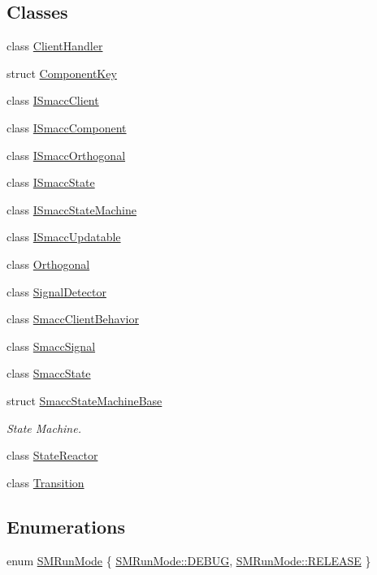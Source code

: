 \subsection*{Classes}
\begin{DoxyCompactItemize}
\item 
class \hyperlink{classsmacc_1_1ClientHandler}{Client\+Handler}
\item 
struct \hyperlink{structsmacc_1_1ComponentKey}{Component\+Key}
\item 
class \hyperlink{classsmacc_1_1ISmaccClient}{I\+Smacc\+Client}
\item 
class \hyperlink{classsmacc_1_1ISmaccComponent}{I\+Smacc\+Component}
\item 
class \hyperlink{classsmacc_1_1ISmaccOrthogonal}{I\+Smacc\+Orthogonal}
\item 
class \hyperlink{classsmacc_1_1ISmaccState}{I\+Smacc\+State}
\item 
class \hyperlink{classsmacc_1_1ISmaccStateMachine}{I\+Smacc\+State\+Machine}
\item 
class \hyperlink{classsmacc_1_1ISmaccUpdatable}{I\+Smacc\+Updatable}
\item 
class \hyperlink{classsmacc_1_1Orthogonal}{Orthogonal}
\item 
class \hyperlink{classsmacc_1_1SignalDetector}{Signal\+Detector}
\item 
class \hyperlink{classsmacc_1_1SmaccClientBehavior}{Smacc\+Client\+Behavior}
\item 
class \hyperlink{classsmacc_1_1SmaccSignal}{Smacc\+Signal}
\item 
class \hyperlink{classsmacc_1_1SmaccState}{Smacc\+State}
\item 
struct \hyperlink{structsmacc_1_1SmaccStateMachineBase}{Smacc\+State\+Machine\+Base}
\begin{DoxyCompactList}\small\item\em State Machine. \end{DoxyCompactList}\item 
class \hyperlink{classsmacc_1_1StateReactor}{State\+Reactor}
\item 
class \hyperlink{classsmacc_1_1Transition}{Transition}
\end{DoxyCompactItemize}
\subsection*{Enumerations}
\begin{DoxyCompactItemize}
\item 
enum \hyperlink{namespacesmacc_a3e4f79486ea6ea6342dd3c712d16a4f6}{S\+M\+Run\+Mode} \{ \hyperlink{namespacesmacc_a3e4f79486ea6ea6342dd3c712d16a4f6adc30ec20708ef7b0f641ef78b7880a15}{S\+M\+Run\+Mode\+::\+D\+E\+B\+UG}, 
\hyperlink{namespacesmacc_a3e4f79486ea6ea6342dd3c712d16a4f6a7d649ef069df9885e382417c79f3d5cd}{S\+M\+Run\+Mode\+::\+R\+E\+L\+E\+A\+SE}
 \}
\end{DoxyCompactItemize}
